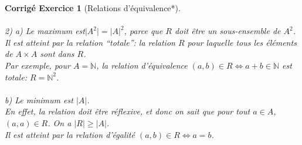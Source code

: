 \documentclass[11pt,french,table]{article}
\theoremstyle{exercice}
\theoremstyle{corrigé}
\newtheorem{corrigé}{Corrigé Exercice}
\begin{document}
\begin{corrigé}[Relations d'équivalence*]
    \\ \\
    2) a) Le maximum est$\vert A^2 \vert = \vert A \vert ^2$, parce que $R$ doit être un sous-ensemble de $A^2$. Il est atteint par la relation ``totale'': la relation $R$ pour laquelle tous les éléments de $A \times A$ sont dans $R$. \\
    Par exemple, pour $A = \mathbb{N}$, la relation d'équivalence $(a,b) \in R \iff a+b \in \mathbb{N}$ est totale: $R = \mathbb{N}^2$. \\ \\
    b) Le minimum est $\vert A \vert$. \\
    En effet, la relation doit être réflexive, et donc on sait que pour tout $a \in A$, $(a,a) \in R$. On a $\vert R \vert \geq \vert A \vert$. \\
    Il est atteint par la relation d'égalité $(a,b) \in R \iff a=b$.
    \end{corrigé}
\end{document}

